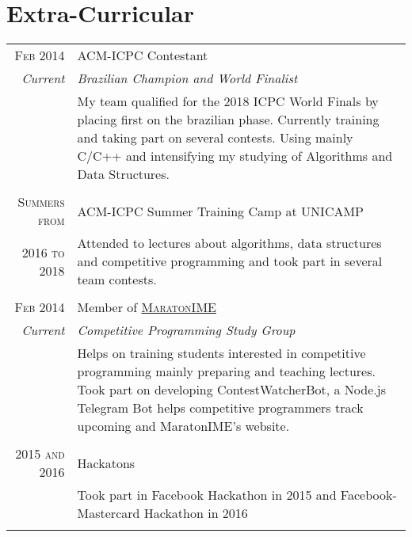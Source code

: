 \documentclass[a4paper,10pt]{article} %
\begin{document}
\section{Extra-Curricular}
\begin{tabular}{r|p{11cm}}
\textsc{Feb 2014}     & \textsc{ACM-ICPC} Contestant \\
\emph{Current}        & \hfill \hfill \textit{Brazilian Champion and World Finalist} \\
& \footnotesize{My team qualified for the 2018 ICPC World Finals by placing first on the brazilian phase. Currently training and taking part on several contests. Using mainly C/C++ and intensifying my studying of Algorithms and Data Structures.} \\
\multicolumn{2}{c}{} \\

\textsc{Summers from} & \textsc{ACM-ICPC} Summer Training Camp at UNICAMP \\
\textsc{2016 to 2018} & \footnotesize{Attended to lectures about algorithms, data structures and competitive programming and took part in several team contests.} \\
\multicolumn{2}{c}{} \\

\textsc{Feb 2014}     & Member of \textsc{\href{https://www.ime.usp.br/~maratona/}{MaratonIME}} \\
\emph{Current}        & \hfill \hfill \textit{Competitive Programming Study Group} \\
    &\footnotesize{Helps on training students interested in competitive programming mainly preparing and teaching lectures. Took part on developing ContestWatcherBot, a Node.js Telegram Bot helps competitive programmers track upcoming and MaratonIME's website.} \\
\multicolumn{2}{c}{} \\

\textsc{2015 and 2016} & Hackatons \\
& \footnotesize{Took part in Facebook Hackathon in 2015 and Facebook-Mastercard Hackathon in 2016} \\
\multicolumn{2}{c}{} \\

\end{tabular}
\end{document}
